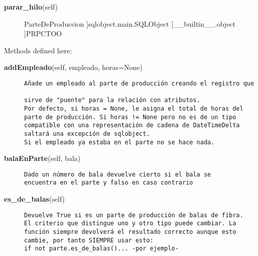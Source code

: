 \begin{description}\item[{\bf parar\_hilo}(self)\end{description}

 \par 


~\\
class {\bf ParteDeProduccion}(sqlobject.main.SQLObject, PRPCTOO)
    
{\tt ~~~}~
\begin{description}\item[Method resolution order:
]ParteDeProduccion
]sqlobject.main.SQLObject
]\_\_builtin\_\_.object
]PRPCTOO
\end{description}

Methods defined here:\\
\begin{description}\item[{\bf addEmpleado}(self, empleado, horas=None)]{\tt Añade~un~empleado~al~parte~de~producción~creando~el~registro~que~\\
sirve~de~\verb|"|puente\verb|"|~para~la~relación~con~atributos.\\
Por~defecto,~si~horas~=~None,~le~asigna~el~total~de~horas~del~\\
parte~de~producción.~Si~horas~!=~None~pero~no~es~de~un~tipo~\\
compatible~con~una~representación~de~cadena~de~DateTimeDelta~\\
saltará~una~excepción~de~sqlobject.\\
Si~el~empleado~ya~estaba~en~el~parte~no~se~hace~nada.}\end{description}

\begin{description}\item[{\bf balaEnParte}(self, bala)]{\tt Dado~un~número~de~bala~devuelve~cierto~si~el~bala~se\\
encuentra~en~el~parte~y~falso~en~caso~contrario}\end{description}

\begin{description}\item[{\bf es\_de\_balas}(self)]{\tt Devuelve~True~si~es~un~parte~de~producción~de~balas~de~fibra.\\
El~criterio~que~distingue~uno~y~otro~tipo~puede~cambiar.~La~\\
función~siempre~devolverá~el~resultado~correcto~aunque~esto~\\
cambie,~por~tanto~SIEMPRE~usar~esto:\\
if~not~parte.es\_de\_balas()...~-por~ejemplo-}\end{description}

